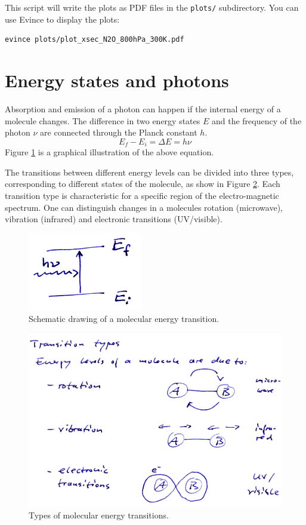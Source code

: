 This script will write the plots as PDF files in the \texttt{plots/}
subdirectory. You can use Evince to display the plots:

\begin{verbatim}
evince plots/plot_xsec_N2O_800hPa_300K.pdf
\end{verbatim}


\section{Energy states and photons}
\label{sec:energy-states}
Absorption and emission of a photon can happen if the internal energy of a
molecule changes. The difference in two energy states $E$ and the frequency of
the photon $\nu$ are connected through the Planck constant $h$.
\begin{equation}
  E_f - E_i = \Delta E = h \nu
\end{equation}
Figure \ref{fig:schematic_energies} is a graphical illustration of the
above equation.

The transitions between different energy levels can be divided into
three types, corresponding to different states of the molecule, as
show in Figure \ref{fig:transition_types}.  Each transition type is
characteristic for a specific region of the electro-magnetic spectrum.
One can distinguish changes in a molecules rotation (microwave),
vibration (infrared) and electronic transitions (UV/visible).

\begin{figure}
  \centering
  \includegraphics[width=5cm]{figures/schematic_energy_states}
  \caption{Schematic drawing of a molecular energy transition.}
  \label{fig:schematic_energies}
\end{figure}

\begin{figure}
  \centering
  \includegraphics[width=\hsize]{figures/transition_types}
  \caption{Types of molecular energy transitions.}
  \label{fig:transition_types}
\end{figure}

